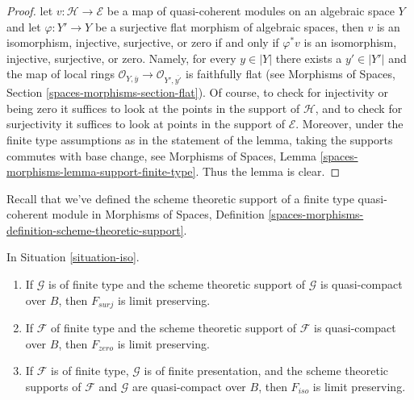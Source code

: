 \begin{proof}
let $v : \mathcal{H} \to \mathcal{E}$ be a map of quasi-coherent
modules on an algebraic space $Y$ and let $\varphi : Y' \to Y$ be a
surjective flat morphism of algebraic spaces, then $v$ is
an isomorphism, injective, surjective, or zero if and only if $\varphi^*v$ is
an isomorphism, injective, surjective, or zero. Namely,
for every $y \in |Y|$ there exists a $y' \in |Y'|$ and the map
of local rings
$\mathcal{O}_{Y, \overline{y}} \to \mathcal{O}_{Y', \overline{y'}}$
is faithfully flat (see
Morphisms of Spaces, Section \ref{spaces-morphisms-section-flat}).
Of course, to check for injectivity or being zero it suffices to look
at the points in the support of $\mathcal{H}$, and to check for
surjectivity it suffices to look at points in the support of $\mathcal{E}$.
Moreover, under the finite type assumptions as in the statement of
the lemma, taking the supports commutes with base change, see
Morphisms of Spaces, Lemma \ref{spaces-morphisms-lemma-support-finite-type}.
Thus the lemma is clear.
\end{proof}

\noindent
Recall that we've defined the scheme theoretic support of a finite
type quasi-coherent module in Morphisms of Spaces, Definition
\ref{spaces-morphisms-definition-scheme-theoretic-support}.

\begin{lemma}
\label{lemma-iso-limits}
In Situation \ref{situation-iso}.
\begin{enumerate}
\item If $\mathcal{G}$ is of finite type and the scheme theoretic support
of $\mathcal{G}$ is quasi-compact over $B$, then $F_{surj}$ is limit
preserving.
\item If $\mathcal{F}$ of finite type and the scheme theoretic support
of $\mathcal{F}$ is quasi-compact over $B$, then
$F_{zero}$ is limit preserving.
\item If $\mathcal{F}$ is of finite type,
$\mathcal{G}$ is of finite presentation, and the
scheme theoretic supports of $\mathcal{F}$ and $\mathcal{G}$ are
quasi-compact over $B$, then $F_{iso}$ is limit preserving.
\end{enumerate}
\end{lemma}

